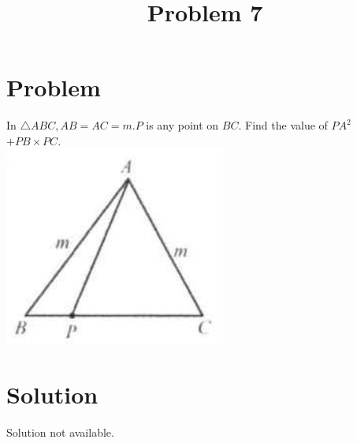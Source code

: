 \documentclass{article}
\title{Problem 7}
\date{}
\begin{document}
\maketitle

\section*{Problem}
In \(\triangle A B C, A B=A C=m . P\) is any point on \(B C\). Find the value of \(P A^{2}\) \(+P B \times P C\).\\
\centering
\includegraphics[width=\textwidth]{images/089(3).jpg}

\section*{Solution}
Solution not available.
\end{document}
